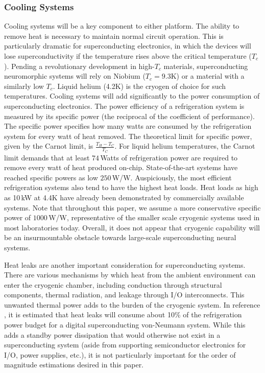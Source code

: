 \documentclass[twocolumn]{article}
\begin{document}
\subsubsection{Cooling Systems}
Cooling systems will be a key component to either platform. The ability to remove heat is necessary to maintain normal circuit operation. This is particularly dramatic for superconducting electronics, in which the devices will lose superconductivity if the temperature rises above the critical temperature ($T_c$). Pending a revolutionary development in high-$T_c$ materials, superconducting neuromorphic systems will rely on Niobium ($T_c = 9.3$K) or a material with a similarly low $T_c$. Liquid helium (4.2K) is the cryogen of choice for such temperatures. Cooling systems will add significantly to the power consumption of superconducting electronics. The power efficiency of a refrigeration system is measured by its specific power (the reciprocal of the coefficient of performance). The specific power specifies how many watts are consumed by the refrigeration system for every watt of heat removed. The theoretical limit for specific power, given by the Carnot limit, is $\frac{T_H - T_C}{T_C}$. For liquid helium temperatures, the Carnot limit demands that at least $74$\,Watts of refrigeration power are required to remove every watt of heat produced on-chip. State-of-the-art systems have reached specific powers as low $250$\,W/W. Auspiciously, the most efficient refrigeration systems also tend to have the highest heat loads. Heat loads as high as 10\,kW at 4.4K have already been demonstrated by commercially available systems. Note that throughout this paper, we assume a more conservative specific power of $1000$\,W/W, representative of the smaller scale cryogenic systems used in most laboratories today. Overall, it does not appear that cryogenic capability will be an insurmountable obstacle towards large-scale superconducting neural systems.

Heat leaks are another important consideration for superconducting systems. There are various mechanisms by which heat from the ambient environment can enter the cryogenic chamber, including conduction through structural components, thermal radiation, and leakage through I/O interconnects. This unwanted thermal power adds to the burden of the cryogenic system. In reference \cite{holmes2013energy}, it is estimated that heat leaks will consume about 10\% of the refrigeration power budget for a digital superconducting von-Neumann system. While this adds a standby power dissipation that would otherwise not exist in a superconducting system (aside from supporting semiconductor electronics for I/O, power supplies, etc.), it is not particularly important for the order of magnitude estimations desired in this paper.
\end{document}
